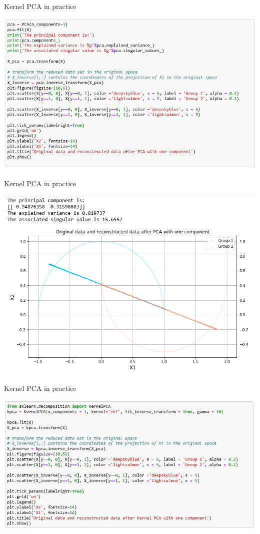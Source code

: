 \documentclass[9pt]{beamer}
\begin{document}
\begin{frame}{Kernel PCA in practice}

\begin{center}
\includegraphics[width = .8\linewidth]{./half_moon_3.png}
\end{center}

\end{frame}

\begin{frame}{Kernel PCA in practice}

\begin{center}
\includegraphics[width = .8\linewidth]{./half_moon_4.png}
\end{center}

\end{frame}

\begin{frame}{Kernel PCA in practice}

\begin{center}
\includegraphics[width = .8\linewidth]{./half_moon_5.png}
\end{center}

\end{frame}
\end{document}
